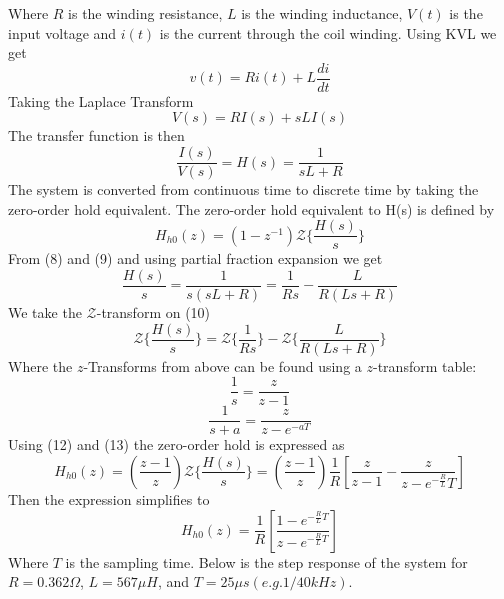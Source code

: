 \documentclass{article}
\begin{document}
Where $R$ is the winding resistance, $L$ is the winding inductance, $V(t)$ is the input voltage and $i(t)$ is the current through the coil winding. Using KVL we get
\begin{equation}
    v(t) = Ri(t) + L\frac{di}{dt}
\end{equation}
Taking the Laplace Transform
\begin{equation}
    V(s) = RI(s) + sLI(s)
\end{equation}
The transfer function is then
\begin{equation}
    \frac{I(s)}{V(s)} = H(s) = \frac{1}{sL+R}
\end{equation}
The system is converted from continuous time to discrete time by taking the zero-order hold equivalent. The zero-order hold equivalent to H(s) is defined by
\begin{equation}
    H_{h0}(z)= (1-z^{-1})\mathcal{Z}\{\frac{H(s)}{s}\}
\end{equation}
From (8) and (9) and using partial fraction expansion we get
\begin{equation}
    \frac{H(s)}{s} = \frac{1}{s(sL+R)} = \frac{1}{Rs} - \frac{L}{R(Ls+R)}
\end{equation}
We take the $\mathcal{Z}$-transform on (10) 
\begin{equation}
    \mathcal{Z}\{\frac{H(s)}{s}\} = \mathcal{Z}\{\frac{1}{Rs}\} - \mathcal{Z}\{\frac{L}{R(Ls+R)}\}
\end{equation}
Where the $z$-Transforms from above can be found using a $z$-transform table:
\begin{equation}
    \frac{1}{s} = \frac{z}{z-1}
\end{equation}
\begin{equation}
    \frac{1}{s+a} = \frac{z}{z-e^{-aT}}
\end{equation}
Using (12) and (13) the zero-order hold is expressed as
\begin{equation}
    H_{h0}(z) = (\frac{z-1}{z})\mathcal{Z}\{\frac{H(s)}{s}\} = (\frac{z-1}{z})\frac{1}{R}\left[ \frac{z}{z-1} - \frac{z}{z-e^{-\frac{R}{L}}T} \right]
\end{equation}
Then the expression simplifies to
\begin{equation}
    H_{h0}(z) = \frac{1}{R}\left[ \frac{1-e^{-\frac{R}{L}T}}{z-e^{-\frac{R}{L}T}} \right]
\end{equation}
Where $T$ is the sampling time. Below is the step response of the system for $R =0.362\Omega$, $L=567 \mu H$, and $T=25\mu s (e.g. 1/40kHz)$.
\end{document}
